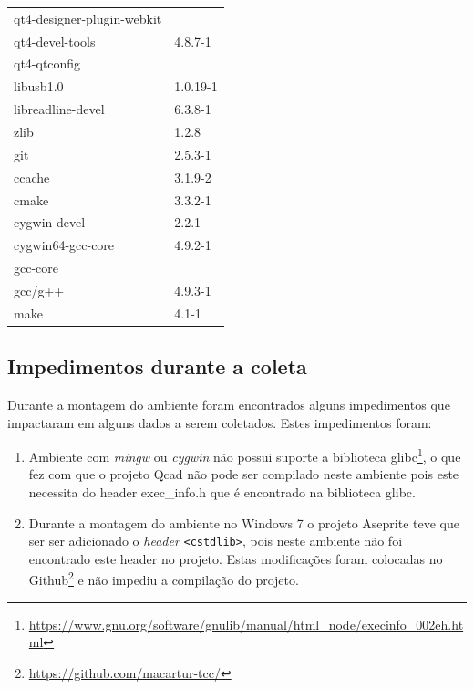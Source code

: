 \begin{itemize}
\begin{table}[h]
\begin{tabular}{ll}
qt4-designer-plugin-webkit  & \\
qt4-devel-tools & 4.8.7-1 \\ 
qt4-qtconfig & \\ \midrule

libusb1.0 & 1.0.19-1 \\ \midrule


libreadline-devel & 6.3.8-1 \\ \midrule

zlib & 1.2.8 \\ \midrule
git & 2.5.3-1 \\ \midrule
ccache & 3.1.9-2 \\ \midrule
cmake & 3.3.2-1 \\ \midrule
cygwin-devel & 2.2.1 \\ \midrule
cygwin64-gcc-core & 4.9.2-1 \\ \midrule
gcc-core & \\ \midrule
gcc/g++ & 4.9.3-1 \\ 
make & 4.1-1 \\ \bottomrule
\end{tabular} 
\end{table}
\end{itemize}

\subsection{Impedimentos durante a coleta}
\label{impedimentos_durante_a_coleta}

	Durante a montagem do ambiente foram encontrados
 alguns impedimentos que impactaram em alguns dados a serem coletados.
Estes impedimentos foram:
 
	\begin{enumerate}[label=\roman* )]
		\item Ambiente com \textit{mingw} ou \textit{cygwin} não possui suporte
 a biblioteca glibc\footnote{\url{https://www.gnu.org/software/gnulib/manual/html\_node/execinfo\_002eh.html}},
 o que fez com que o projeto Qcad não pode ser compilado neste ambiente pois este necessita do header exec\_info.h que é encontrado na biblioteca glibc.
		\item Durante a montagem do ambiente no Windows 7 o projeto Aseprite teve que ser  
 ser adicionado o \textit{header} \texttt{<cstdlib>}, pois neste ambiente não foi
 encontrado este header no projeto. Estas modificações foram colocadas no
 Github\footnote{\url{https://github.com/macartur-tcc/}} e não impediu a
 compilação do projeto.
	\end{enumerate}


